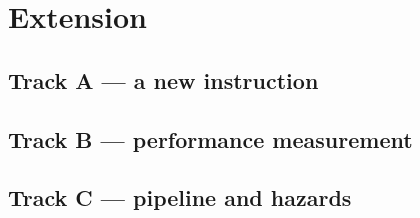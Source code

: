 
\section{Extension}

\subsection*{Track A --- a new instruction}

\subsection*{Track B --- performance measurement}

\subsection*{Track C --- pipeline and hazards}


